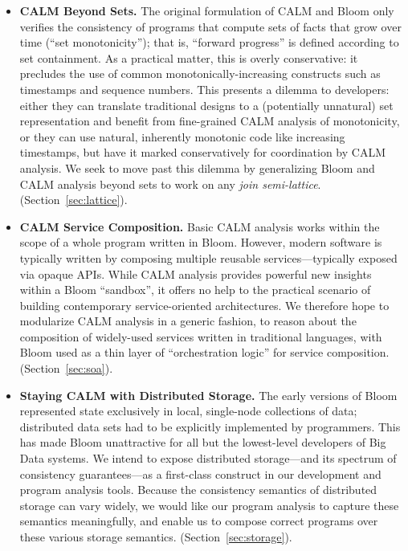 \begin{itemize}
  \item \textbf{CALM Beyond Sets.}  The original formulation of CALM and Bloom only verifies the consistency of programs that compute sets of facts that grow over time (``set monotonicity''); that is, ``forward progress'' is defined according to set containment. As a practical matter, this is overly conservative: it precludes the use of common monotonically-increasing constructs such as timestamps and sequence numbers.  This presents a dilemma to developers: either they can translate traditional designs to a (potentially unnatural) set representation and benefit from fine-grained CALM analysis of monotonicity, or they can use natural, inherently monotonic code like increasing timestamps, but have it marked conservatively for coordination by CALM analysis.  We seek to move past this dilemma by generalizing Bloom and CALM analysis beyond sets to work on any \emph{join semi-lattice}.  (Section~\ref{sec:lattice}).

  \item \textbf{CALM Service Composition.}  Basic CALM analysis works within the scope of a whole program written in Bloom. However, modern software is typically written by composing multiple reusable services---typically exposed via opaque APIs. While CALM analysis provides powerful new insights within a Bloom ``sandbox'', it offers no help to the practical scenario of building contemporary service-oriented architectures.  We therefore hope to modularize CALM analysis in a generic fashion, to reason about the composition of widely-used services written in traditional languages, with Bloom used as a thin layer of ``orchestration logic'' for service composition.  (Section~\ref{sec:soa}).

  \item \textbf{Staying CALM with Distributed Storage.} The early versions of Bloom represented state exclusively in local, single-node collections of data; distributed data sets had to be explicitly implemented by programmers.  This has made Bloom unattractive for all but the lowest-level developers of Big Data systems.  We intend to expose distributed storage---and its spectrum of consistency guarantees---as a first-class construct in our development and program analysis tools.  Because the consistency semantics of distributed storage can vary widely, we would like our program analysis to capture these semantics meaningfully, and enable us to compose correct programs over these various storage semantics.    (Section~\ref{sec:storage}).
  

\end{itemize}
